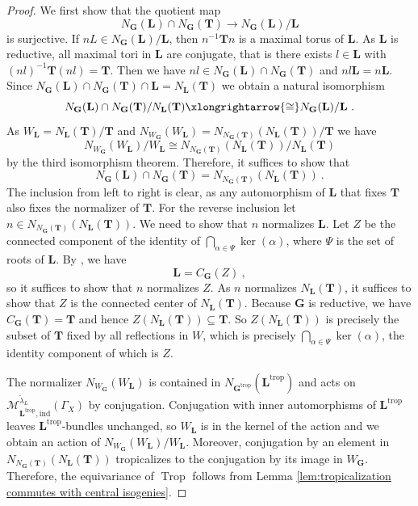 \documentclass[10pt, a4paper]{amsart}
\theoremstyle{definition}
\theoremstyle{myitemstyle}
\newcommand{\lambdacheck}{\check{\lambda}}
\newcommand{\bfG}{\mathbf{G}}
\newcommand{\bfT}{\mathbf{T}}
\newcommand{\bfL}{\mathbf{L}}
\newcommand{\mc}[1]{{\mathcal{#1}}}
\DeclareMathOperator{\Trop}{Trop}
\newcommand{\ind}{\mathrm{ind}}
\newcommand{\trop}{{\mathrm{trop}}}
\begin{document}
\begin{proof}
We first show that the quotient map 
\[
N_\bfG(\bfL)\cap N_\bfG(\bfT)\longrightarrow N_\bfG(\bfL)/\bfL
\]
is surjective. If $nL\in N_\bfG(\bfL)/\bfL$, then $n^{-1} \bfT n$ is a maximal torus of $\bfL$. As $\bfL$ is reductive, all maximal tori in $\bfL$ are conjugate, that is there exists $l\in \bfL$ with $(nl)^{-1} \bfT(nl)=\bfT$. Then we have $nl\in N_\bfG(\bfL)\cap N_\bfG(\bfT)$ and $nl\bfL=n\bfL$. Since $N_\bfG(\bfL)\cap N_\bfG(\bfT)\cap\bfL= N_\bfL(\bfT)$ we obtain a natural isomorphism
\[
N_\bfG(\bfL)\cap N_\bfG(\bfT)/N_\bfL(\bfT) \xlongrightarrow{\cong}N_\bfG(\bfL)/\bfL \ .
\]
As $W_\bfL=N_\bfL(\bfT)/\bfT$ and $N_{W_\bfG}(W_\bfL)=N_{N_\bfG(\bfT)}(N_\bfL(\bfT))/\bfT$ we have
\[
N_{W_\bfG}(W_\bfL)/W_\bfL \cong N_{N_\bfG(\bfT)}(N_\bfL(\bfT))/N_\bfL(\bfT)
\]
by the third isomorphism theorem. Therefore, it suffices to show that 
\[
N_\bfG(\bfL)\cap N_\bfG(\bfT)= N_{N_\bfG(\bfT)}(N_\bfL(\bfT)) \ .
\]
The inclusion from left to right is clear, as any automorphism of $\bfL$ that fixes $\bfT$ also fixes the normalizer of $\bfT$. For the reverse inclusion let $n\in  N_{N_\bfG(\bfT)}(N_\bfL(\bfT))$. We need to show that $n$ normalizes $\bfL$. Let $Z$ be the connected component of the identity of $\bigcap_{\alpha\in \Psi}\ker(\alpha)$, where $\Psi$ is the set of roots of $\bfL$. By \cite[Section 30.2]{Humphreys}, we have 
\[
\bfL=C_\bfG(Z) \ , 
\]
 so it suffices to show that $n$ normalizes $Z$. As $n$ normalizes $N_\bfL(\bfT)$, it suffices to show that $Z$ is the connected center of $N_\bfL(\bfT)$. Because $\bfG$ is reductive, we have $C_\bfG(\bfT)=\bfT$ and hence $Z(N_\bfL(\bfT))\subseteq \bfT$. So $Z(N_\bfL(\bfT))$ is precisely the subset of $\bfT$ fixed by all reflections in $W$, which is precisely $\bigcap_{\alpha\in \Psi}\ker(\alpha)$, the identity component of which is $Z$.

The normalizer $N_{W_\bfG}(W_\bfL)$ is contained in $N_{\bfG^\trop}(\bfL^\trop)$ and acts on $\mc M_{\bfL^\trop,\ind}^{\lambdacheck_L}(\Gamma_X)$ by conjugation. Conjugation with inner automorphisms of $\bfL^\trop$ leaves $\bfL^\trop$-bundles unchanged, so $W_\bfL$ is in the kernel of the action and we obtain an action of $N_{W_\bfG}(W_\bfL)/W_\bfL$. Moreover, conjugation by an element in $N_{N_\bfG(\bfT)}(N_\bfL(\bfT))$ tropicalizes to the conjugation by its image in $W_\bfG$. Therefore, the equivariance of $\Trop$ follows from Lemma \ref{lem:tropicalization commutes with central isogenies}.
\end{proof}
\end{document}

